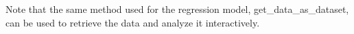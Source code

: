 Note that the same method used for the regression model, get\_data\_as\_dataset, can be used to retrieve the data and analyze it interactively. 

%
%
